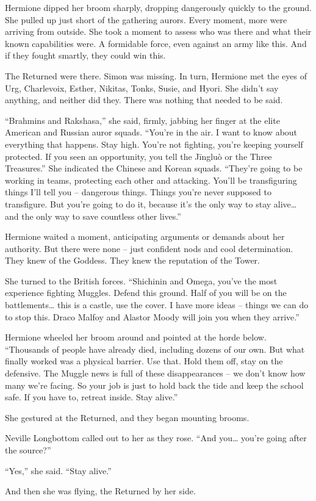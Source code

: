 Hermione dipped her broom sharply, dropping dangerously quickly to the
ground. She pulled up just short of the gathering aurors. Every moment,
more were arriving from outside. She took a moment to assess who was
there and what their known capabilities were. A formidable force, even
against an army like this. And if they fought smartly, they could win
this.

The Returned were there. Simon was missing. In turn, Hermione met the
eyes of Urg, Charlevoix, Esther, Nikitas, Tonks, Susie, and Hyori. She
didn't say anything, and neither did they. There was nothing that needed
to be said.

``Brahmins and Rakshasa,'' she said, firmly, jabbing her finger at the
elite American and Russian auror squads. ``You're in the air. I want to
know about everything that happens. Stay high. You're not fighting,
you're keeping yourself protected. If you seen an opportunity, you tell
the Jīngluò or the Three Treasures.'' She indicated the Chinese and
Korean squads. ``They're going to be working in teams, protecting each
other and attacking. You'll be transfiguring things I'll tell you --
dangerous things. Things you're never supposed to transfigure. But
you're going to do it, because it's the only way to stay alive\ldots{}
and the only way to save countless other lives.''

Hermione waited a moment, anticipating arguments or demands about her
authority. But there were none -- just confident nods and cool
determination. They knew of the Goddess. They knew the reputation of the
Tower.

She turned to the British forces. ``Shichinin and Omega, you've the most
experience fighting Muggles. Defend this ground. Half of you will be on
the battlements\ldots{} this is a castle, use the cover. I have more
ideas -- things we can do to stop this. Draco Malfoy and Alastor Moody
will join you when they arrive.''

Hermione wheeled her broom around and pointed at the horde below.
``Thousands of people have already died, including dozens of our own.
But what finally worked was a physical barrier. Use that. Hold them off,
stay on the defensive. The Muggle news is full of these disappearances
-- we don't know how many we're facing. So your job is just to hold back
the tide and keep the school safe. If you have to, retreat inside. Stay
alive.''

She gestured at the Returned, and they began mounting brooms.

Neville Longbottom called out to her as they rose. ``And you\ldots{}
you're going after the source?''

``Yes,'' she said. ``Stay alive.''

And then she was flying, the Returned by her side.
